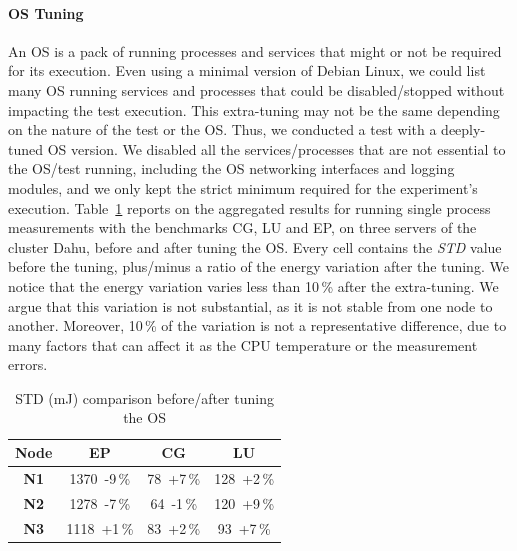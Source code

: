 \paragraph{OS Tuning}
An OS is a pack of running processes and services that might or not be required for its execution.
Even using a minimal version of Debian Linux, we could list many OS running services and processes that could be disabled/stopped without impacting the test execution.
This extra-tuning may not be the same depending on the nature of the test or the OS.
Thus, we conducted a test with a deeply-tuned OS version.
We disabled all the services/processes that are not essential to the OS/test running, including the OS networking interfaces and logging modules, and we only kept the strict minimum required for the experiment's execution.
Table~\ref{table:osmin} reports on the aggregated results for running single process measurements with the benchmarks \textsf{CG}, \textsf{LU} and \textsf{EP}, on three servers of the cluster \textsf{Dahu}, before and after tuning the OS.
Every cell contains the \emph{STD} value before the tuning, plus/minus a ratio of the energy variation after the tuning.
We notice that the energy variation varies less than 10\,\% after the extra-tuning.
We argue that this variation is not substantial, as it is not stable from one node to another.
Moreover, 10\,\% of the variation is not a representative difference, due to many factors that can affect it as the CPU temperature or the measurement errors.

\begin{table}
    \centering
    \caption{STD (mJ) comparison before/after tuning the OS}
    \label{table:osmin}
    \small
    \begin{tabular}{|c|c|c|c|}
        \hline
        \textbf{Node} & \textbf{\sf EP} & \textbf{\sf CG} & \textbf{\sf LU} \\
        \hline
        \hline
        \textbf{N1}   & 1370~-9\,\%     & 78~+7\,\%       & 128~+2\,\%      \\
        \hline
        \textbf{N2}   & 1278~-7\,\%     & 64~-1\,\%       & 120~+9\,\%      \\
        \hline
        \textbf{N3}   & 1118~+1\,\%     & 83~+2\,\%       & 93~+7\,\%       \\
        \hline
    \end{tabular}
\end{table}

